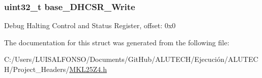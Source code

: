 \subsubsection[{base\+\_\+\+D\+H\+C\+S\+R\+\_\+\+Write}]{\setlength{\rightskip}{0pt plus 5cm}uint32\+\_\+t base\+\_\+\+D\+H\+C\+S\+R\+\_\+\+Write}\label{struct_core_debug___mem_map_a033962700f14389a6ecb3282097e4308}
Debug Halting Control and Status Register, offset\+: 0x0 

The documentation for this struct was generated from the following file\+:\begin{DoxyCompactItemize}
\item 
C\+:/\+Users/\+L\+U\+I\+S\+A\+L\+F\+O\+N\+S\+O/\+Documents/\+Git\+Hub/\+A\+L\+U\+T\+E\+C\+H/\+Ejecución/\+A\+L\+U\+T\+E\+C\+H/\+Project\+\_\+\+Headers/\hyperlink{_m_k_l25_z4_8h}{M\+K\+L25\+Z4.\+h}\end{DoxyCompactItemize}
